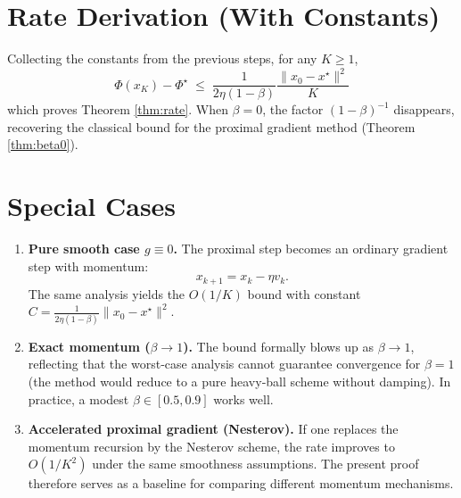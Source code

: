 \documentclass{article}
\begin{document}
\section*{Rate Derivation (With Constants)}
Collecting the constants from the previous steps, for any $K\ge1$,
\[
\boxed{\;
\Phi(x_{K})-\Phi^{\star}\;\le\;
\frac{1}{2\eta(1-\beta)}\frac{\|x_{0}-x^{\star}\|^{2}}{K}
\;}
\]
which proves Theorem \ref{thm:rate}. When $\beta=0$, the factor $(1-\beta)^{-1}$ disappears, recovering the classical bound for the proximal gradient method (Theorem \ref{thm:beta0}).

\section*{Special Cases}
\begin{enumerate}
\item \textbf{Pure smooth case $g\equiv0$.}  
The proximal step becomes an ordinary gradient step with momentum:
\[
x_{k+1}=x_{k}-\eta v_{k}.
\]
The same analysis yields the $O(1/K)$ bound with constant $C=\frac{1}{2\eta(1-\beta)}\|x_{0}-x^{\star}\|^{2}$.

\item \textbf{Exact momentum ($\beta\to1$).}  
The bound formally blows up as $\beta\to1$, reflecting that the worst‑case analysis cannot guarantee convergence for $\beta=1$ (the method would reduce to a pure heavy‑ball scheme without damping). In practice, a modest $\beta\in[0.5,0.9]$ works well.

\item \textbf{Accelerated proximal gradient (Nesterov).}  
If one replaces the momentum recursion by the Nesterov scheme, the rate improves to $O(1/K^{2})$ under the same smoothness assumptions. The present proof therefore serves as a baseline for comparing different momentum mechanisms.
\end{enumerate}
\end{document}
